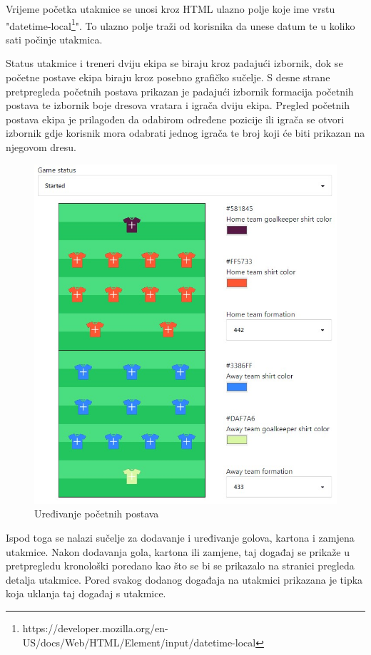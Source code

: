 \documentclass[times, utf8, zavrsni]{fer}
\begin{document}
Vrijeme početka utakmice se unosi kroz HTML ulazno polje koje ime vrstu "datetime-local\footnote{https://developer.mozilla.org/en-US/docs/Web/HTML/Element/input/datetime-local}".
To ulazno polje traži od korisnika da unese datum te u koliko sati počinje utakmica.

Status utakmice i treneri dviju ekipa se biraju kroz padajući izbornik, dok se početne postave ekipa biraju kroz posebno grafičko sučelje.
S desne strane pretpregleda početnih postava prikazan je padajući izbornik formacija početnih postava te izbornik boje dresova vratara i igrača dviju ekipa.
Pregled početnih postava ekipa je prilagođen da odabirom određene pozicije ili igrača se otvori izbornik gdje korisnik mora odabrati jednog igrača te broj koji će biti prikazan na njegovom dresu.

\begin{figure}[htb]
\centering
\includegraphics[width=12cm]{images/edit-game.jpg}
\caption{Uređivanje početnih postava}
\label{fig:formation}
\end{figure}

Ispod toga se nalazi sučelje za dodavanje i uređivanje golova, kartona i zamjena utakmice.
Nakon dodavanja gola, kartona ili zamjene, taj događaj se prikaže u pretpregledu kronološki poredano kao što se bi se prikazalo na stranici pregleda detalja utakmice.
Pored svakog dodanog događaja na utakmici prikazana je tipka koja uklanja taj događaj s utakmice.
\end{document}
